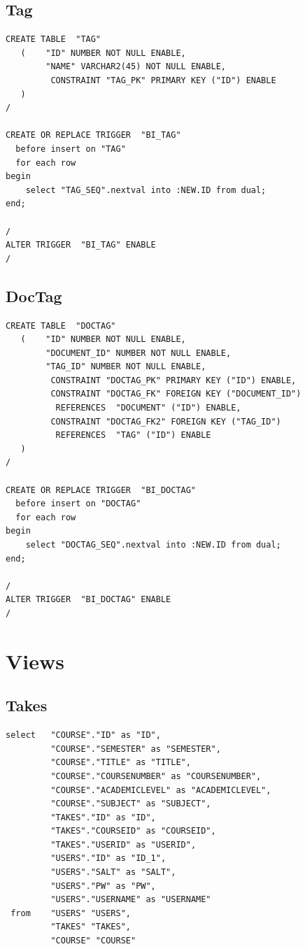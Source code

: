 \documentclass[11pt]{article}
\begin{document}
\subsection{Tag}
\label{sec-4-9}



\begin{verbatim}
CREATE TABLE  "TAG" 
   (    "ID" NUMBER NOT NULL ENABLE, 
        "NAME" VARCHAR2(45) NOT NULL ENABLE, 
         CONSTRAINT "TAG_PK" PRIMARY KEY ("ID") ENABLE
   )
/

CREATE OR REPLACE TRIGGER  "BI_TAG" 
  before insert on "TAG"               
  for each row  
begin   
    select "TAG_SEQ".nextval into :NEW.ID from dual; 
end; 

/
ALTER TRIGGER  "BI_TAG" ENABLE
/
\end{verbatim}
\subsection{DocTag}
\label{sec-4-10}



\begin{verbatim}
CREATE TABLE  "DOCTAG" 
   (    "ID" NUMBER NOT NULL ENABLE, 
        "DOCUMENT_ID" NUMBER NOT NULL ENABLE, 
        "TAG_ID" NUMBER NOT NULL ENABLE, 
         CONSTRAINT "DOCTAG_PK" PRIMARY KEY ("ID") ENABLE, 
         CONSTRAINT "DOCTAG_FK" FOREIGN KEY ("DOCUMENT_ID")
          REFERENCES  "DOCUMENT" ("ID") ENABLE, 
         CONSTRAINT "DOCTAG_FK2" FOREIGN KEY ("TAG_ID")
          REFERENCES  "TAG" ("ID") ENABLE
   )
/

CREATE OR REPLACE TRIGGER  "BI_DOCTAG" 
  before insert on "DOCTAG"               
  for each row  
begin   
    select "DOCTAG_SEQ".nextval into :NEW.ID from dual; 
end; 

/
ALTER TRIGGER  "BI_DOCTAG" ENABLE
/
\end{verbatim}
\section{Views}
\label{sec-5}
\subsection{Takes}
\label{sec-5-1}



\begin{verbatim}
select   "COURSE"."ID" as "ID",
         "COURSE"."SEMESTER" as "SEMESTER",
         "COURSE"."TITLE" as "TITLE",
         "COURSE"."COURSENUMBER" as "COURSENUMBER",
         "COURSE"."ACADEMICLEVEL" as "ACADEMICLEVEL",
         "COURSE"."SUBJECT" as "SUBJECT",
         "TAKES"."ID" as "ID",
         "TAKES"."COURSEID" as "COURSEID",
         "TAKES"."USERID" as "USERID",
         "USERS"."ID" as "ID_1",
         "USERS"."SALT" as "SALT",
         "USERS"."PW" as "PW",
         "USERS"."USERNAME" as "USERNAME" 
 from    "USERS" "USERS",
         "TAKES" "TAKES",
         "COURSE" "COURSE"
\end{verbatim}
\end{document}
